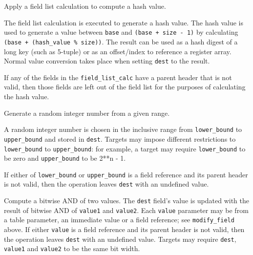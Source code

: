 \documentclass[12pt]{article}
\begin{document}

{ %
{Apply a field list calculation to compute a hash value.}
}
{ %
}
{ %
The field list calculation is executed to generate a hash value.  
The hash value is used to generate a value between \texttt{base} and 
\texttt{(base + size - 1)} by calculating \texttt{(base + (hash_value \% size))}. 
The result can be used as a hash digest of a long key (such as 5-tuple) or as 
an offset/index to reference a register array. Normal value conversion 
takes place when setting \texttt{dest} to the result.

If any of the fields in the \texttt{field_list_calc} have a parent
header that is not valid, then those fields are left out of the field list for the purposes of calculating the hash value.
}


{ %
Generate a random integer number from a given range.
}
{ %
}
{ %
A random integer number is chosen in the inclusive range from \texttt{lower_bound} to \texttt{upper_bound}
and stored in \texttt{dest}. 
Targets may impose different restrictions to \texttt{lower_bound} to \texttt{upper_bound}: 
for example, a target may require \texttt{lower_bound} 
to be zero and \texttt{upper_bound} to be 2**n - 1.

If either of \texttt{lower_bound} or \texttt{upper_bound} is a field reference
and its parent header is not valid, then the operation leaves
\texttt{dest} with an undefined value.
}


{ %
Compute a bitwise AND of two values.
}
{ %
}
{ %
The \texttt{dest} field's value is updated with the result of bitwise AND of
\texttt{value1} and \texttt{value2}. Each \texttt{value} parameter may be from a
table parameter, an immediate value or a field reference; see \texttt{modify_field} above. If either \texttt{value}
is a field reference and its parent header is not valid, then the operation
leaves \texttt{dest} with an undefined value.
Targets may require \texttt{dest}, \texttt{value1} and \texttt{value2} to
be the same bit width.
}
\end{document}
